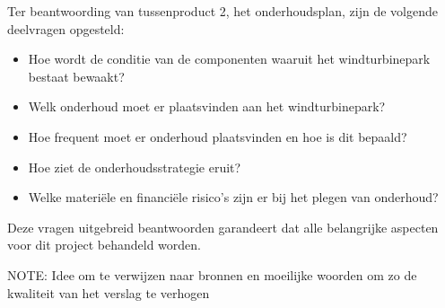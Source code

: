 Ter beantwoording van tussenproduct 2, het onderhoudsplan, zijn de volgende deelvragen opgesteld:
\begin{itemize}
    \item Hoe wordt de conditie van de componenten waaruit het windturbinepark bestaat bewaakt? 
    \item Welk onderhoud moet er plaatsvinden aan het windturbinepark?
    \item Hoe frequent moet er onderhoud plaatsvinden en hoe is dit bepaald?
    \item Hoe ziet de onderhoudsstrategie eruit? 
    \item Welke materiële en financiële risico's zijn er bij het plegen van onderhoud?
\end{itemize}

Deze vragen uitgebreid beantwoorden garandeert dat alle belangrijke aspecten voor dit project behandeld worden. 




NOTE: Idee om te verwijzen naar bronnen en moeilijke woorden om zo de kwaliteit van het verslag te verhogen